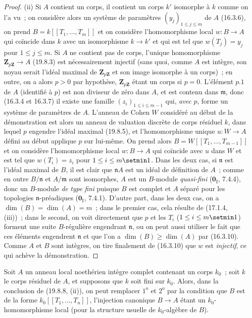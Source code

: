 \begin{proof}
\medskip
\noindent(ii)\enspace
Si $A$ contient un corps, il contient un corps $k'$ isomorphe à $k$ comme on
l'a vu~; on considère alors un système de paramètres
$(y_j)_{1\leq j\leq m}$ de $A$ (16.3.6), on prend
$B=k[[T_1,\ldots,T_m]]$ et on considère l'homomorphisme local $w:B\to A$ qui
coïncide dans $k$ avec un isomorphisme $k\to k'$ et qui est tel que
$w(T_j)=y_j$ pour $1\leq j\leq m$. Si $A$ ne contient pas de corps, l'unique
homomorphisme $\mathbf Z_{p\mathbf Z}\to A$ (19.8.3) est nécessairement
injectif (sans quoi, comme $A$ est intègre, son noyau serait l'idéal maximal de
$\mathbf Z_{p\mathbf Z}$ et son image isomorphe à un corps)~; en outre, on a
alors $p>0$ par hypothèse, $\mathbf Z_{p\mathbf Z}$ étant un corps si $p=0$.
L'élément $p.1$ de $A$ (identifié à $p$) est non diviseur de zéro dans $A$,
et est contenu dans $\mathfrak m$, donc (16.3.4 et 16.3.7) il existe une famille
$(z_i)_{1\leq i\leq m-1}$ qui, \emph{avec $p$}, forme un système de paramètres de $A$.
L'anneau de Cohen $W$ considéré au début de la démonstration est alors un
anneau de valuation discrète de corps résiduel $k$, dans lequel $p$ engendre
l'idéal maximal (19.8.5), et l'homomorphisme unique $u:W\to A$ défini au début
applique $p$ sur lui-même. On prend alors $B=W[[T_1,\ldots,T_{m-1}]]$ et on
considère l'homomorphisme local $w:B\to A$ qui coïncide avec $u$ dans $W$ et
est tel que $w(T_i)=z_i$ pour $1\leq i\leq m\setmin 1$. Dans les deux cas, si
$\mathfrak n$ est l'idéal maximal de $B$, il est clair que $\mathfrak nA$ est
un idéal de définition de $A$~; comme en outre $B/\mathfrak n$ et
$A/\mathfrak m$ sont isomorphes, $A$ est un $B$-module \emph{quasi-fini}
($\mathbf 0_{\mathrm I}$, 7.4.4), donc un $B$-module \emph{de type fini} puisque $B$
est complet et $A$ séparé pour les topologies $\mathfrak n$-préadiques
($\mathbf 0_{\mathrm I}$, 7.4.1). D'autre part,
dans les deux cas, on a $\dim(B)=\dim(A)=m$~; dans le premier cas, cela résulte
de (17.1.4, (iii))~; dans le second, on voit directement que $p$ et les $T_i$
($1\leq i\leq m\setmin 1$) forment une suite $B$-régulière engendrant $\mathfrak n$,
ou on peut aussi utiliser le fait que ces éléments engendrent $\mathfrak n$ et
que l'on a $\dim(B)\geq\dim(A)$ par (16.3.10). Comme $A$ et $B$ sont intègres,
on tire finalement de (16.3.10) que $w$ est \emph{injectif}, ce qui achève la
démonstration.
\end{proof}

\begin{corollary}[19.8.9]
\label{0.19.8.9-fr}
Soit $A$ un anneau local noethérien intègre complet contenant un corps $k_0$~;
soit $k$ le corps résiduel de $A$, et supposons que $k$ soit fini sur $k_0$.
Alors, dans la conclusion de \textup{(19.8.8, (ii))}, on peut remplacer $1^{\mathrm o}$
et $2^{\mathrm o}$ par la condition que $B$ est de la forme
$k_0[[T_1,\ldots,T_n]]$, l'injection canonique $B\to A$ étant un
$k_0$-homomorphisme local (pour la structure usuelle de $k_0$-algèbre de $B$).
\end{corollary}

